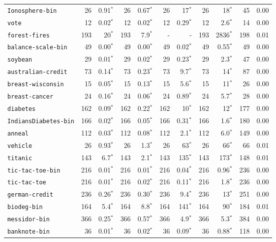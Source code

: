 \begin{tabular}{lrrrrrrrrrr}
\texttt{Ionosphere-bin} & 26 & 0.91$^*$ & 26 & 0.67$^*$ & 26 & 17$^*$ & 26 & 18$^*$ & 45 & 0.00\\
\texttt{vote} & 12 & 0.02$^*$ & 12 & 0.02$^*$ & 12 & 0.29$^*$ & 12 & 2.6$^*$ & 14 & 0.00\\
\texttt{forest-fires} & 193 & 20$^*$ & 193 & 7.9$^*$ & - & - & 193 & 2836$^*$ & 198 & 0.01\\
\texttt{balance-scale-bin} & 49 & 0.00$^*$ & 49 & 0.00$^*$ & 49 & 0.02$^*$ & 49 & 0.55$^*$ & 49 & 0.00\\
\texttt{soybean} & 29 & 0.01$^*$ & 29 & 0.02$^*$ & 29 & 0.23$^*$ & 29 & 2.3$^*$ & 47 & 0.00\\
\texttt{australian-credit} & 73 & 0.14$^*$ & 73 & 0.23$^*$ & 73 & 9.7$^*$ & 73 & 14$^*$ & 87 & 0.00\\
\texttt{breast-wisconsin} & 15 & 0.05$^*$ & 15 & 0.13$^*$ & 15 & 5.6$^*$ & 15 & 11$^*$ & 26 & 0.00\\
\texttt{breast-cancer} & 24 & 0.16$^*$ & 24 & 0.06$^*$ & 24 & 0.89$^*$ & 24 & 5.7$^*$ & 28 & 0.00\\
\texttt{diabetes} & 162 & 0.09$^*$ & 162 & 0.22$^*$ & 162 & 10$^*$ & 162 & 12$^*$ & 177 & 0.00\\
\texttt{IndiansDiabetes-bin} & 166 & 0.02$^*$ & 166 & 0.05$^*$ & 166 & 0.31$^*$ & 166 & 1.6$^*$ & 180 & 0.00\\
\texttt{anneal} & 112 & 0.03$^*$ & 112 & 0.08$^*$ & 112 & 2.1$^*$ & 112 & 6.0$^*$ & 149 & 0.00\\
\texttt{vehicle} & 26 & 0.93$^*$ & 26 & 1.3$^*$ & 26 & 63$^*$ & 26 & 66$^*$ & 66 & 0.01\\
\texttt{titanic} & 143 & 6.7$^*$ & 143 & 2.1$^*$ & 143 & 135$^*$ & 143 & 173$^*$ & 148 & 0.01\\
\texttt{tic-tac-toe-bin} & 216 & 0.01$^*$ & 216 & 0.01$^*$ & 216 & 0.04$^*$ & 216 & 0.96$^*$ & 236 & 0.00\\
\texttt{tic-tac-toe} & 216 & 0.01$^*$ & 216 & 0.02$^*$ & 216 & 0.11$^*$ & 216 & 1.8$^*$ & 236 & 0.00\\
\texttt{german-credit} & 236 & 0.26$^*$ & 236 & 0.30$^*$ & 236 & 9.4$^*$ & 236 & 13$^*$ & 251 & 0.00\\
\texttt{biodeg-bin} & 164 & 5.4$^*$ & 164 & 8.8$^*$ & 164 & 141$^*$ & 164 & 90$^*$ & 184 & 0.01\\
\texttt{messidor-bin} & 366 & 0.25$^*$ & 366 & 0.57$^*$ & 366 & 4.9$^*$ & 366 & 5.3$^*$ & 384 & 0.00\\
\texttt{banknote-bin} & 36 & 0.01$^*$ & 36 & 0.02$^*$ & 36 & 0.09$^*$ & 36 & 0.88$^*$ & 118 & 0.00\\

\end{tabular}
